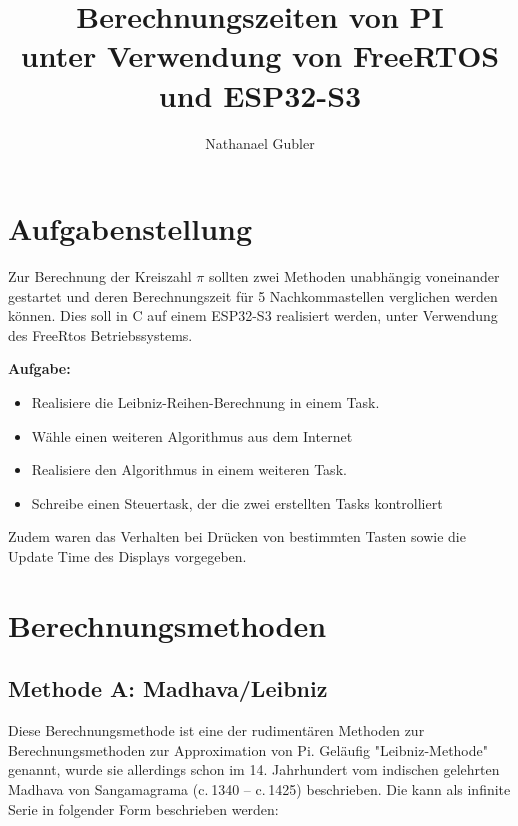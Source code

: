 \documentclass[ngerman,10pt,a4paper,titlepage]{report}
\title{{\huge \textbf{Berechnungszeiten von PI\\ unter Verwendung von FreeRTOS und ESP32-S3}}}
\author{Nathanael Gubler}
\renewcommand{\headrulewidth}{1.5pt}%
\renewcommand{\footrulewidth}{0.4pt}%
\begin{document}
	\pagestyle{fancy}
	\renewcommand{\headrulewidth}{1.5pt}
	\renewcommand{\footrulewidth}{0.4pt}
	\addtolength{\headwidth}{-2cm}
	
	\doublespacing
	\maketitle
	
	\tableofcontents
	\begingroup
	\let\clearpage\relax
	\listoffigures
	\listoftables
	\endgroup
	
	\chapter{Aufgabenstellung}
	\doublespacing
	Zur Berechnung der Kreiszahl $\pi$ sollten zwei Methoden unabhängig voneinander gestartet und deren Berechnungszeit für 5 Nachkommastellen verglichen werden können. Dies soll in C auf einem ESP32-S3 realisiert werden, unter Verwendung des FreeRtos Betriebssystems.\newline
	
	\textbf{Aufgabe:}
	\begin{itemize}
		\item Realisiere die Leibniz-Reihen-Berechnung in einem Task.
		\item Wähle einen weiteren Algorithmus aus dem Internet
		\item Realisiere den Algorithmus in einem weiteren Task.
		\item Schreibe einen Steuertask, der die zwei erstellten Tasks kontrolliert
	\end{itemize}
	Zudem waren das Verhalten bei Drücken von bestimmten Tasten sowie die Update Time des Displays vorgegeben.
	
	\chapter{Berechnungsmethoden}
	\section{Methode A: Madhava/Leibniz}\label{MethodeA}
	\doublespacing
	\justifying
	Diese Berechnungsmethode ist eine der rudimentären Methoden zur Berechnungsmethoden zur Approximation von Pi. Geläufig "Leibniz-Methode" genannt, wurde sie allerdings schon im 14. Jahrhundert vom indischen gelehrten Madhava von Sangamagrama (c. 1340 – c. 1425) beschrieben. Die kann als infinite Serie in folgender Form beschrieben werden:
	
\end{document}
